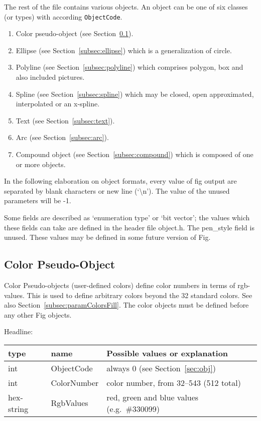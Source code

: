 \documentclass[10pt, a4paper]{article}
\begin{document}
The rest of the file contains various objects.  
An object can be one of six classes (or types) with according \texttt{ObjectCode}.
%
\begin{enumerate}
\item[0]
Color pseudo-object (see Section~\ref{subsec:colorPseudoObj}). 
\item
Ellipse (see Section~\ref{subsec:ellipse}) which is a generalization of circle.
\item
Polyline (see Section~\ref{subsec:polyline}) which comprises polygon, 
box and also included pictures.
\item
Spline (see Section~\ref{subsec:spline}) 
which may be closed, open approximated, interpolated or an x-spline.
\item
Text (see Section~\ref{subsec:text}).
\item
Arc (see Section~\ref{subsec:arc}).
\item
Compound object (see Section~\ref{subsec:compound}) 
which is composed of one or more objects. 
\end{enumerate}

In the following elaboration on object formats, 
every value of fig output are separated by blank characters 
or new line (`\textbackslash{}n').  
The value of the unused parameters will be -1.

 Some fields are described as `enumeration type' or `bit vector'; the
 values which these fields can take are defined in the header file object.h.
 The pen\_style field is unused.
 These values may be defined in some future version of Fig.


\setcounter{subsection}{-1}
\subsection{Color Pseudo-Object}\label{subsec:colorPseudoObj}

Color Pseudo-objects (user-defined colors) 
define color numbers in terms of rgb-values. 
This is used to define arbitrary colors beyond the 32 standard colors. 
See also Section~\ref{subsec:paramColorsFill}. 
The color objects must be defined before any other Fig objects.

\noindent
Headline: \\
%
\begin{tabular}{lll}
\toprule
type & name & Possible values or explanation \\
\midrule
\midrule
int        & ObjectCode  & always 0 (see Section~\ref{sec:obj}) \\
int        & ColorNumber & color number, from 32--543 (512 total)\\
hex-string & RgbValues   & red, green and blue values (e.g.~\#330099) \\
\bottomrule
\end{tabular}
\end{document}
